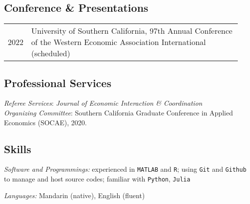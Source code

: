 \documentclass[letterpaper]{article}
\renewenvironment{itemize}{
  \begin{list}{}{
    \setlength{\leftmargin}{1.5em}
    \setlength{\itemsep}{0.25em}
    \setlength{\parskip}{0pt}
    \setlength{\parsep}{0.25em}
  }
}{
  \end{list}
}
\begin{document}
\subsection*{\bf Conference \& Presentations}
\begin{tabular}{p{0.03\linewidth}p{0.92\linewidth}}
  \multicolumn{1}{l}{2022} & University of Southern California, 
  97th Annual Conference of the Western Economic Association International (scheduled)
\end{tabular}


\subsection*{\bf Professional Services}
{\it Referee Services}: \textit{Journal of Economic Interaction \& Coordination}\\
{\it Organizing Committee}: Southern California Graduate Conference in Applied Economics (SOCAE), 2020.

\subsection*{\bf Skills}

\begin{itemize}
  \item {\it Software and Programmings:} experienced in {\tt MATLAB} and {\tt R}; using {\tt Git} and {\tt Github} to manage and host source codes; familiar with {\tt Python}, {\tt Julia}
  \item {\it Languages:} Mandarin (native), English (fluent)
\end{itemize}


\end{document}
